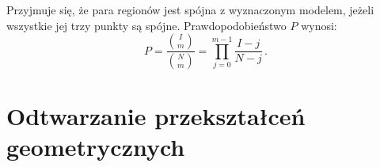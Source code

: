 Przyjmuje się, że para regionów jest spójna z wyznaczonym modelem, jeżeli
wszystkie jej trzy punkty są spójne. Prawdopodobieństwo $P$ wynosi: $$P =
\frac{{I \choose m}}{{N \choose m}} = \prod_{j=0}^{m-1}\frac{I - j}{N-j} \,.$$


\section{Odtwarzanie przekształceń geometrycznych}


